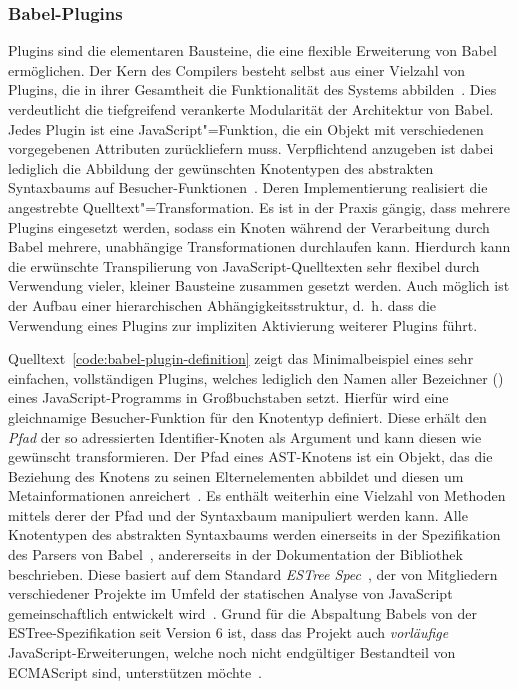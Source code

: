 \subsubsection{Babel-Plugins}
\label{subsection:babel-plugins}

Plugins sind die elementaren Bausteine, die eine flexible Erweiterung von Babel ermöglichen. Der Kern des Compilers besteht selbst aus einer Vielzahl von Plugins, die in ihrer Gesamtheit die Funktionalität des Systems abbilden~\autocite{BABEL}. Dies verdeutlicht die tiefgreifend verankerte Modularität der Architektur von Babel. Jedes Plugin ist eine JavaScript"=Funktion, die ein Objekt mit verschiedenen vorgegebenen Attributen zurückliefern muss. Verpflichtend anzugeben ist dabei lediglich die Abbildung der gewünschten Knotentypen des abstrakten Syntaxbaums auf Besucher-Funktionen~\autocite{BABEL:HANDBOOK}. Deren Implementierung realisiert die angestrebte Quelltext"=Transformation. Es ist in der Praxis gängig, dass mehrere Plugins eingesetzt werden, sodass ein Knoten während der Verarbeitung durch Babel mehrere, unabhängige Transformationen durchlaufen kann. Hierdurch kann die erwünschte Transpilierung von JavaScript-Quelltexten sehr flexibel durch Verwendung vieler, kleiner Bausteine zusammen gesetzt werden. Auch möglich ist der Aufbau einer hierarchischen Abhängigkeitsstruktur, d.~h. dass die Verwendung eines Plugins zur impliziten Aktivierung weiterer Plugins führt.

Quelltext~\ref{code:babel-plugin-definition} zeigt das Minimalbeispiel eines sehr einfachen, vollständigen Plugins, welches lediglich den Namen aller Bezeichner () eines JavaScript-Programms in Großbuchstaben setzt. Hierfür wird eine gleichnamige Besucher-Funktion für den Knotentyp  definiert. Diese erhält den \emph{Pfad} der so adressierten Identifier-Knoten als Argument und kann diesen wie gewünscht transformieren. Der Pfad eines AST-Knotens ist ein Objekt, das die Beziehung des Knotens zu seinen Elternelementen abbildet und diesen um Metainformationen anreichert~\autocite{BABEL:HANDBOOK}. Es enthält weiterhin eine Vielzahl von Methoden mittels derer der Pfad und der Syntaxbaum manipuliert werden kann.
Alle Knotentypen des abstrakten Syntaxbaums werden einerseits in der Spezifikation des Parsers von Babel~\autocite{BABEL:PARSER_SPEC,BABEL:PARSER}, andererseits in der Dokumentation der Bibliothek \autocite{BABEL:TYPES} beschrieben. Diese basiert auf dem Standard \textit{ESTree Spec}~\autocite{ESTREE_SPEC}, der von Mitgliedern verschiedener Projekte im Umfeld der statischen Analyse von JavaScript gemeinschaftlich entwickelt wird~\autocite{BABEL:PARSER,ESTREE_SPEC}. Grund für die Abspaltung Babels von der ESTree-Spezifikation seit Version 6 ist, dass das Projekt auch \emph{vorläufige} JavaScript-Erweiterungen, welche noch nicht endgültiger Bestandteil von ECMAScript sind, unterstützen möchte~\autocite{BABEL:STATE_OF_BABEL}.

